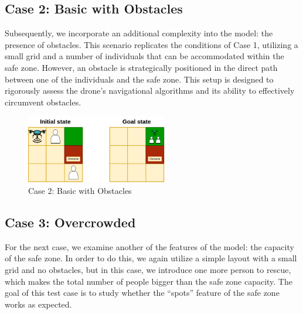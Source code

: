 \documentclass{article}
\begin{document}
\FloatBarrier

\subsection{Case 2: Basic with Obstacles}

Subsequently, we incorporate an additional complexity into the model: the presence of obstacles. This scenario replicates the conditions of Case 1, utilizing a small grid and a number of individuals that can be accommodated within the safe zone. However, an obstacle is strategically positioned in the direct path between one of the individuals and the safe zone. This setup is designed to rigorously assess the drone's navigational algorithms and its ability to effectively circumvent obstacles.

\begin{figure}[ht]
    \centering
    \includegraphics[width=0.55\textwidth]{assets/problem-2-basic-obstacle.drawio.png}
    \caption{Case 2: Basic with Obstacles}
    \label{fig:initial-state-obstacles}
\end{figure}

\FloatBarrier

\subsection{Case 3: Overcrowded}

For the next case, we examine another of the features of the model: the capacity of the safe zone. In order to do this, we again utilize a simple layout with a small grid and no obstacles, but in this case, we introduce one more person to rescue, which makes the total number of people bigger than the safe zone capacity. The goal of this test case is to study whether the “spots” feature of the safe zone works as expected.
\end{document}
